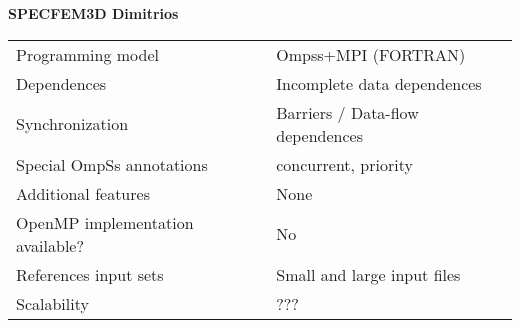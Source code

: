 \section*{}
\label{specfem3D_dimitrios}
\centering
\Huge
\textbf{SPECFEM3D Dimitrios}

\begin{table}[h!]
  \large
  \centering
  \begin{tabular}{|l|l|}
    \hline
    Programming model                & Ompss+MPI (FORTRAN)\\
    Dependences                      & Incomplete data dependences \\
    Synchronization                  & Barriers / Data-flow dependences \\
    Special OmpSs annotations        & concurrent, priority\\
    Additional features              & None\\
    OpenMP implementation available? & No \\
    References input sets            & Small and large input files \\
    Scalability                      & ??? \\
    \hline
  \end{tabular}
\end{table}

\newpage
